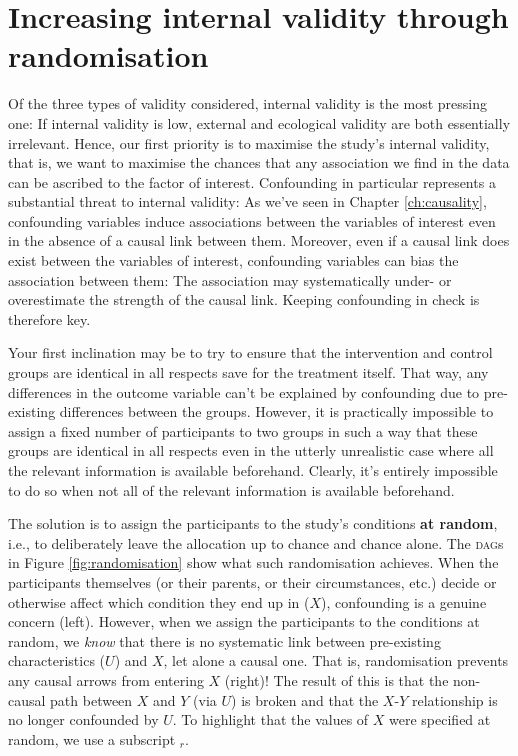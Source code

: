 \documentclass[a4paper]{tufte-book}\usepackage[]{graphicx}\usepackage[]{xcolor}
\newcommand{\term}[1]{\textbf{#1}}
\begin{document}
\section{Increasing internal validity through randomisation}
Of the three types of validity considered, 
internal validity is the most pressing one:
If internal validity is low, external and ecological validity are both
essentially irrelevant.
Hence,
our first priority is to maximise the study's internal validity, that is,
we want to maximise the chances that any association we find in the data
can be ascribed to the factor of interest.
Confounding in particular represents a substantial threat to internal validity:
As we've seen in Chapter \ref{ch:causality}, confounding variables induce
associations between the variables of interest even in the absence of a causal
link between them. Moreover, even if a causal link does exist between the
variables of interest, confounding variables can bias the association
between them: The association may systematically under- or overestimate the
strength of the causal link. Keeping confounding in check is therefore key.

Your first inclination may be to try to ensure that the intervention and
control groups are identical in all respects save for the treatment itself.
That way, any differences in the outcome variable can't be explained by
confounding due to pre-existing differences between the groups.
However, it is practically
impossible to assign a fixed number of participants to two groups in such a
way that these groups are identical in all respects even in the utterly
unrealistic case where all the relevant information is available beforehand.
Clearly, it's entirely impossible to do so when not all of the relevant information
is available beforehand.

The solution is to assign the participants 
to the study's conditions \term{at random}, i.e., to deliberately leave the allocation
up to chance and chance alone. The \textsc{dag}s in Figure \vref{fig:randomisation} show what such
randomisation achieves. When the participants themselves (or their parents,
or their circumstances, etc.) decide or otherwise affect which condition they end up in ($X$),
confounding is a genuine concern (left).
However, when we assign the participants to the conditions at random,
we \emph{know} that there is no systematic link between pre-existing characteristics
($U$) and $X$, let alone a causal one. That is, randomisation prevents any
causal arrows from entering $X$ (right)! The result of this is that the
non-causal path between $X$ and $Y$ (via $U$) is broken and that the $X$-$Y$
relationship is no longer confounded by $U$.
To highlight that the values of $X$ were specified at random,
we use a subscript $_r$.
\end{document}
